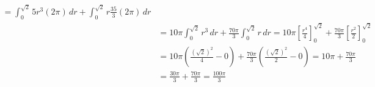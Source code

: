 \documentclass[10pt,letterpaper,fleqn]{article}
\begin{document}
\begin{enumerate}
\begin{equation*}
\begin{split}
                        = \int_0^{\sqrt{2}}{5r^3 (2\pi) }\,d r + \int_0^{\sqrt{2}}{ r \frac{35}{3} (2\pi)}\,d r
                        \\& = 10\pi \int_0^{\sqrt{2}}{r^3 }\,d r + 
                        \frac{70\pi}{3} \int_0^{\sqrt{2}}{r}\,d r
                        = 10\pi \left[\frac{r^4}{4}\right]_0^{\sqrt{2}} + \frac{70\pi}{3} \left[\frac{r^2}{2}\right]_0^{\sqrt{2}}
                        \\& = 10\pi (\frac{(\sqrt{2})^2}{4} - 0) + 
                        \frac{70\pi}{3} (\frac{(\sqrt{2})^2}{2}-0)
                        = 10\pi + \frac{70\pi}{3}
                        \\& = \frac{30\pi}{3} + \frac{70\pi}{3} 
                        = \frac{100\pi}{3}
                \end{split}
                \end{equation*}


\end{enumerate}
\end{document}
